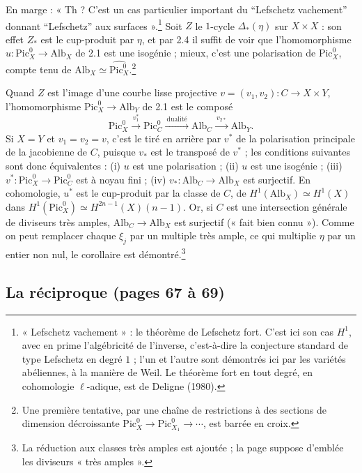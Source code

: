 \documentclass[11pt,a4paper]{article}
\begin{document}
En marge : « Th ? C'est un cas particulier important du “Lefschetz vachement”
donnant “Lefschetz” aux surfaces ».\footnote{« Lefschetz vachement » : le
théorème de Lefschetz fort. C'est ici son cas $H^{1}$, avec en prime
l'algébricité de l'inverse, c'est-à-dire la conjecture standard de type
Lefschetz en degré $1$ ; l'un et l'autre sont démontrés ici par les variétés
abéliennes, à la manière de Weil. Le théorème fort en tout degré, en
cohomologie $\ell$-adique, est de Deligne (1980).} Soit $Z$ le $1$-cycle
$\Delta_{*}(\eta)$ sur $X \times X$ : son effet $Z_{*}$ est le cup-produit par
$\eta$, et par 2.4 il suffit de voir que l'homomorphisme $u \colon
\mathrm{Pic}^{0}_{X} \to \mathrm{Alb}_{X}$ de 2.1 est une isogénie ; mieux, c'est
une polarisation de $\mathrm{Pic}^{0}_{X}$, compte tenu de $\mathrm{Alb}_{X}
\simeq \widehat{\mathrm{Pic}^{0}_{X}}$.\footnote{Une première tentative, par une
chaîne de restrictions à des sections de dimension décroissante
$\mathrm{Pic}^{0}_{X} \to \mathrm{Pic}^{0}_{X_{1}} \to \cdots$, est barrée en
croix.}

Quand $Z$ est l'image d'une courbe lisse projective $v = (v_{1}, v_{2}) \colon C
\to X \times Y$, l'homomorphisme $\mathrm{Pic}^{0}_{X} \to \mathrm{Alb}_{Y}$ de
2.1 est le composé
\[
\mathrm{Pic}^{0}_{X} \xrightarrow{\ v_{1}^{*}\ } \mathrm{Pic}^{0}_{C}
\xrightarrow{\ \text{dualité}\ } \mathrm{Alb}_{C}
\xrightarrow{\ v_{2*}\ } \mathrm{Alb}_{Y} .
\]
Si $X = Y$ et $v_{1} = v_{2} = v$, c'est le tiré en arrière par $v^{*}$ de la
polarisation principale de la jacobienne de $C$, puisque $v_{*}$ est le transposé
de $v^{*}$ ; les conditions suivantes sont donc équivalentes : (i) $u$ est une
polarisation ; (ii) $u$ est une isogénie ; (iii) $v^{*} \colon
\mathrm{Pic}^{0}_{X} \to \mathrm{Pic}^{0}_{C}$ est à noyau fini ; (iv) $v_{*}
\colon \mathrm{Alb}_{C} \to \mathrm{Alb}_{X}$ est surjectif. En cohomologie,
$u^{*}$ est le cup-produit par la classe de $C$, de $H^{1}(\mathrm{Alb}_{X})
\simeq H^{1}(X)$ dans $H^{1}(\mathrm{Pic}^{0}_{X}) \simeq H^{2n-1}(X)(n-1)$.
Or, si $C$ est une intersection générale de diviseurs très amples,
$\mathrm{Alb}_{C} \to \mathrm{Alb}_{X}$ est surjectif (« fait bien connu »).
Comme on peut remplacer chaque $\xi_{j}$ par un multiple très ample, ce qui
multiplie $\eta$ par un entier non nul, le corollaire est
démontré.\footnote{La réduction aux classes très amples est ajoutée ; la page
suppose d'emblée les diviseurs « très amples ».}

\subsection*{La réciproque (pages 67 à 69)}
\end{document}
